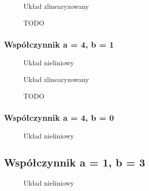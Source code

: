 \documentclass[a4paper, 10pt]{article}
\begin{document}
				
				\begin{figure}[H]
					\centering
					\def \svgwidth{0.75\columnwidth}
					
					\caption{Układ zlinearyzowany}
				\end{figure}\noindent
				
				
				\begin{figure}[H]
					\centering
					\def \svgwidth{0.75\columnwidth}
					
					\caption{TODO}
				\end{figure}\noindent
			
			\subsubsection{Współczynnik a = 4, b = 1}
				\begin{figure}[H]
					\centering
					\def \svgwidth{0.75\columnwidth}
					
					\caption{Układ nieliniowy}
				\end{figure}\noindent
				
				
				\begin{figure}[H]
					\centering
					\def \svgwidth{0.75\columnwidth}
					
					\caption{Układ zlinearyzowany}
				\end{figure}\noindent
				
				
				
				\begin{figure}[H]
					\centering
					\def \svgwidth{0.75\columnwidth}
					
					\caption{TODO}
				\end{figure}\noindent
				
			\subsubsection{Współczynnik a = 4, b = 0}
				\begin{figure}[H]
					\centering
					\def \svgwidth{0.75\columnwidth}
					
					\caption{Układ nieliniowy}
				\end{figure}\noindent
				
			\subsection{Współczynnik a = 1, b = 3}
				\begin{figure}[H]
					\centering
					\def \svgwidth{0.75\columnwidth}
					
					\caption{Układ nieliniowy}
				\end{figure}\noindent
				
\end{document}
